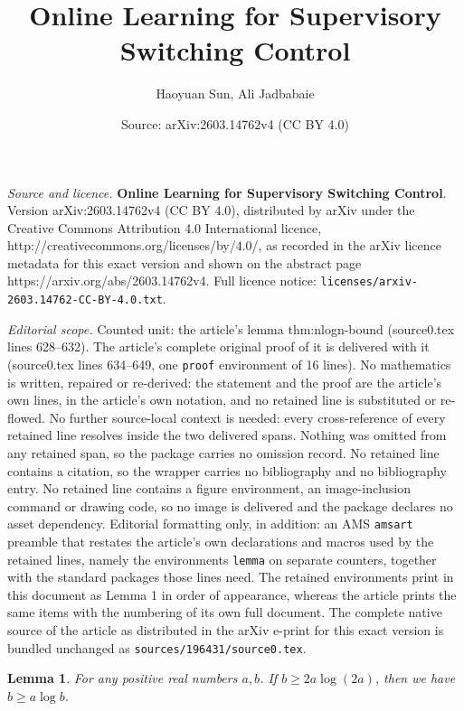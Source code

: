 \documentclass[10pt,a4paper]{amsart}
\title{\textbf{Online Learning for Supervisory Switching Control}}
\author{Haoyuan Sun, Ali Jadbabaie}
\date{Source: arXiv:2603.14762v4 (CC BY 4.0)}
\newtheorem{lemma}{Lemma}
\begin{document}
\maketitle

\noindent\emph{Source and licence.} \textbf{Online Learning for Supervisory Switching Control}. Version arXiv:2603.14762v4 (CC BY 4.0), distributed by arXiv under the Creative Commons Attribution 4.0 International licence, http://creativecommons.org/licenses/by/4.0/, as recorded in the arXiv licence metadata for this exact version and shown on the abstract page https://arxiv.org/abs/2603.14762v4. Full licence notice: \texttt{licenses/arxiv-2603.14762-CC-BY-4.0.txt}.\par\smallskip

\noindent\textit{Editorial scope.} Counted unit: the article's lemma thm:nlogn-bound (source0.tex lines 628--632). The article's complete original proof of it is delivered with it (source0.tex lines 634--649, one \texttt{proof} environment of 16 lines). No mathematics is written, repaired or re-derived: the statement and the proof are the article's own lines, in the article's own notation, and no retained line is substituted or re-flowed.  No further source-local context is needed: every cross-reference of every retained line resolves inside the two delivered spans.  Nothing was omitted from any retained span, so the package carries no omission record.  No retained line contains a citation, so the wrapper carries no bibliography and no bibliography entry.  No retained line contains a figure environment, an image-inclusion command or drawing code, so no image is delivered and the package declares no asset dependency.  Editorial formatting only, in addition: an AMS \texttt{amsart} preamble that restates the article's own declarations and macros used by the retained lines, namely the environments \texttt{lemma} on separate counters, together with the standard packages those lines need.  The retained environments print in this document as Lemma 1 in order of appearance, whereas the article prints the same items with the numbering of its own full document.  The complete native source of the article as distributed in the arXiv e-print for this exact version is bundled unchanged as \texttt{sources/196431/source0.tex}.
\begin{lemma}
\label{thm:nlogn-bound}
    For any positive real numbers $a, b$.
    If $b \ge 2a\log(2a)$, then we have $b \ge a \log b$.
\end{lemma}
\end{document}
